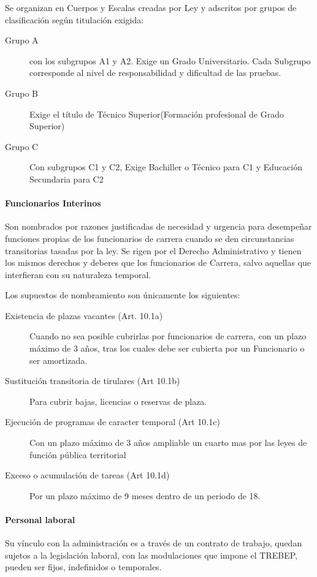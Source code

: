             Se organizan en Cuerpos y Escalas creadas por Ley y adscritos por grupos de clasificación según titulación exigida:
            \begin{description}
                \item[Grupo A] con los subgrupos A1 y A2. Exige un Grado Universitario. Cada Subgrupo corresponde al nivel de responsabilidad y dificultad de las pruebas.
                \item[Grupo B] Exige el título de Técnico Superior(Formación profesional de Grado Superior)
                \item[Grupo C] Con subgrupos C1 y C2, Exige Bachiller o Técnico para C1 y Educación Secundaria para C2
            \end{description}

        \paragraph{Funcionarios Interinos}
            Son nombrados por razones justificadas de necesidad y urgencia para desempeñar funciones propias de los funcionarios de carrera cuando se den circunstancias transitorias tasadas por la ley. Se rigen por el Derecho Administrativo y tienen los mismos derechos y deberes que los funcionarios de Carrera, salvo aquellas que interfieran con su naturaleza temporal.

            Los supuestos de nombramiento son únicamente los siguientes:
            \begin{description}
                \item[Existencia de plazas vacantes (Art. 10.1a)] Cuando no sea posible cubrirlas por funcionarios de carrera, con un plazo máximo de 3 años, tras los cuales debe ser cubierta por un Funcionario o ser amortizada.
                \item[Sustitución transitoria de tirulares (Art 10.1b)] Para cubrir bajas, licencias o reservas de plaza.
                \item[Ejecución de programas de caracter temporal (Art 10.1c)] Con un plazo máximo de 3 años ampliable un cuarto mas por las leyes de función pública territorial
                \item[Exceso o acumulación de tareas (Art 10.1d)] Por un plazo máximo de 9 meses dentro de un periodo de 18.
            \end{description}

        \paragraph{Personal laboral}
            Su vínculo con la administración es a través de un contrato de trabajo, quedan sujetos a la legislación laboral, con las modulaciones que impone el TREBEP, pueden ser fijos, indefinidos o temporales.

